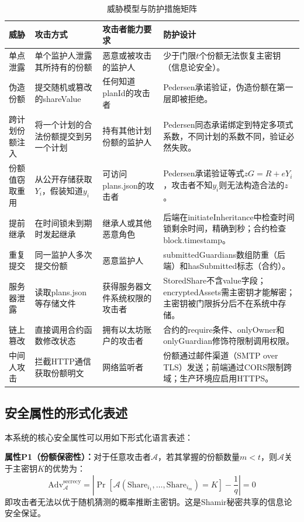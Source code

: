 \documentclass[UTF8,a4paper,zihao=-4,openany]{ctexrep}
\begin{document}
\begin{table}[htbp]
\centering
\caption{威胁模型与防护措施矩阵}
\begin{tabularx}{\textwidth}{p{2.8cm}p{3.8cm}p{4cm}X}
\toprule
威胁 & 攻击方式 & 攻击者能力要求 & 防护设计\\
\midrule
单点泄露 & 单个监护人泄露其所持有的份额 & 恶意或被攻击的监护人 & 少于门限$t$个份额无法恢复主密钥（信息论安全）。\\
伪造份额 & 提交随机或篡改的shareValue & 任何知道planId的攻击者 & Pedersen承诺验证，伪造份额在第一层即被拒绝。\\
跨计划份额注入 & 将一个计划的合法份额提交到另一个计划 & 持有其他计划份额的监护人 & Pedersen同态承诺绑定到特定多项式系数，不同计划的系数不同，验证必然失败。\\
份额值窃取重用 & 从公开存储获取$Y_i$，假装知道$y_i$ & 可访问plans.json的攻击者 & Pedersen承诺验证等式$zG=R+eY_i$，攻击者不知$y_i$则无法构造合法的$z$。\\
提前继承 & 在时间锁未到期时发起继承 & 继承人或其他恶意角色 & 后端在initiateInheritance中检查时间锁剩余时间，精确到秒；合约检查block.timestamp。\\
重复提交 & 同一监护人多次提交份额 & 恶意监护人 & submittedGuardians数组防重（后端）和hasSubmitted标志（合约）。\\
服务器泄露 & 读取plans.json等存储文件 & 获得服务器文件系统权限的攻击者 & StoredShare不含value字段；encryptedAssets需主密钥才能解密；主密钥被门限拆分后不在系统中存储。\\
链上篡改 & 直接调用合约函数修改状态 & 拥有以太坊账户的攻击者 & 合约的require条件、onlyOwner和onlyGuardian修饰符限制调用权限。\\
中间人攻击 & 拦截HTTP通信获取份额明文 & 网络监听者 & 份额通过邮件渠道（SMTP over TLS）发送；前端通过CORS限制跨域；生产环境应启用HTTPS。\\
\bottomrule
\end{tabularx}
\end{table}

\subsection{安全属性的形式化表述}

本系统的核心安全属性可以用如下形式化语言表述：

\textbf{属性P1（份额保密性）：}对于任意攻击者$\mathcal{A}$，若其掌握的份额数量$m < t$，则$\mathcal{A}$关于主密钥$K$的优势为：
\[
\text{Adv}_{\mathcal{A}}^{\text{secrecy}} = \left|\Pr[\mathcal{A}(\text{Share}_{i_1},\dots,\text{Share}_{i_m}) = K] - \frac{1}{q}\right| = 0
\]
即攻击者无法以优于随机猜测的概率推断主密钥。这是Shamir秘密共享的信息论安全保证。
\end{document}

